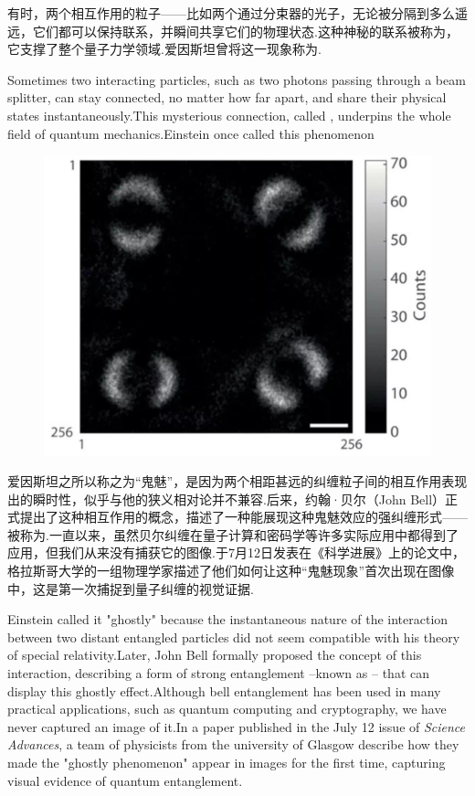 

\begin{multicols}{2}

有时，两个相互作用的粒子——比如两个通过分束器的光子，无论被分隔到多么遥远，它们都可以保持联系，并瞬间共享它们的物理状态.这种神秘的联系被称为，它支撑了整个量子力学领域.爱因斯坦曾将这一现象称为.

Sometimes two interacting particles, such as two photons passing through a beam splitter, can stay connected, no matter how far apart, and share their physical states instantaneously.This mysterious connection, called , underpins the whole field of quantum mechanics.Einstein once called this phenomenon 

\begin{figure}[H]
    \centering
    \includegraphics[width=0.7\linewidth]{IMG/201907/01.jpg}
    \caption{}
    
\end{figure}

爱因斯坦之所以称之为“鬼魅”，是因为两个相距甚远的纠缠粒子间的相互作用表现出的瞬时性，似乎与他的狭义相对论并不兼容.后来，约翰·贝尔（John Bell）正式提出了这种相互作用的概念，描述了一种能展现这种鬼魅效应的强纠缠形式——被称为.一直以来，虽然贝尔纠缠在量子计算和密码学等许多实际应用中都得到了应用，但我们从来没有捕获它的图像.于7月12日发表在《科学进展》上的论文中，格拉斯哥大学的一组物理学家描述了他们如何让这种“鬼魅现象”首次出现在图像中，这是第一次捕捉到量子纠缠的视觉证据.

Einstein called it "ghostly" because the instantaneous nature of the interaction between two distant entangled particles did not seem compatible with his theory of special relativity.Later, John Bell formally proposed the concept of this  interaction, describing a form of strong entanglement --known as  -- that can display this ghostly effect.Although bell entanglement has been used in many practical applications, such as quantum computing and cryptography, we have never captured an image of it.In a paper published in the July 12 issue of \textit{Science Advances}\/, a team of physicists from the university of Glasgow describe how they made the "ghostly phenomenon" appear in images for the first time, capturing visual evidence of quantum entanglement.


\end{multicols}
